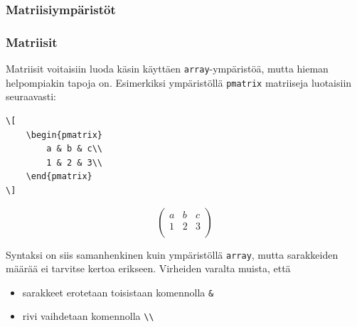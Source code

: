 \documentclass[handout,hyperref={colorlinks=true}]{beamer}
\theoremstyle{remark}
\begin{document}
\subsubsection{Matriisiympäristöt}
\begin{frame}[fragile]
    \frametitle{Matriisit}
    Matriisit voitaisiin luoda käsin käyttäen \verb-array--ympäristöä, mutta hieman helpompiakin tapoja on. Esimerkiksi ympäristöllä \verb-pmatrix- matriiseja luotaisiin seuraavasti:

    \begin{minipage}{4cm}
        \begin{scriptsize}
            \begin{Verbatim}[frame=single]
\[
    \begin{pmatrix}
        a & b & c\\
        1 & 2 & 3\\
    \end{pmatrix}
\]
            \end{Verbatim}
        \end{scriptsize}
    \end{minipage}
    \begin{minipage}{4cm}
        \[
            \begin{pmatrix}
                a & b & c\\
                1 & 2 & 3\\
            \end{pmatrix}
        \]
    \end{minipage}

Syntaksi on siis samanhenkinen kuin ympäristöllä \verb-array-, mutta sarakkeiden määrää ei tarvitse kertoa erikseen. Virheiden varalta muista, että
    \begin{itemize}
        \item sarakkeet erotetaan toisistaan komennolla \verb-&-
        \item rivi vaihdetaan komennolla \verb-\\-
    \end{itemize}

\end{frame}
\end{document}
